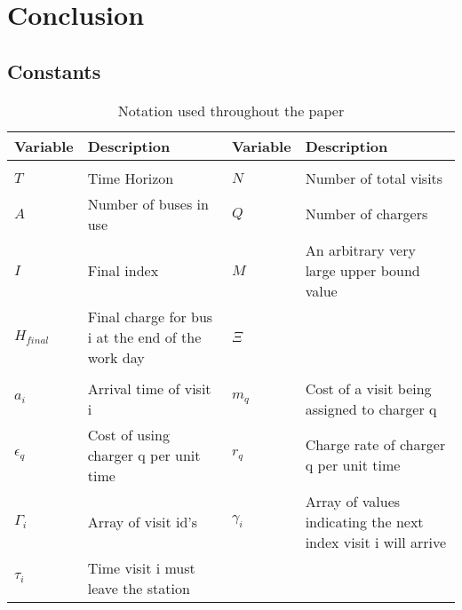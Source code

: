 \documentclass[conference]{IEEEtran}
\begin{document}
\section{Conclusion}

\subsection{Constants}\label{constants}

\begin{table*}[!t]
	\caption{Notation used throughout the paper}
	\label{tab:variables}
	\centering
	\begin{tabular}{l l l l}
		\toprule
		\textbf{Variable} & \textbf{Description} & \textbf{Variable} & \textbf{Description} \\
		\toprule
		\multicolumn{4}{l}{} \\
			$T$         & \textrm{Time Horizon}                                                         &
			$N$         & \textrm{Number of total visits}                                            \\
			$A$         & \textrm{Number of buses in use}                                               &
			$Q$         & \textrm{Number of chargers}                                                \\
			$I$         & \textrm{Final index}                                                          &
			$M$         & \textrm{An arbitrary very large upper bound value}                         \\
			$H_{final}$ & \textrm{Final charge for bus } i \textrm{ at the end of the work day}         &
			$\Xi$       & \\
		\hline
		\multicolumn{4}{l}{} \\
			$a_i$        & \textrm{Arrival time of visit } i                                                    &
			$m_q$        & \textrm{Cost of a visit being assigned to charger } q                                  \\
			$\epsilon_q$ & \textrm{Cost of using charger } q \textrm{ per unit time}                            &
			$r_q$        & \textrm{Charge rate of charger } q \textrm{ per unit time}                             \\
			$\Gamma_i$   & \textrm{Array of visit id's}                                                         &
			$\gamma_i$   & \textrm{Array of values indicating the next index visit } i \textrm{ will arrive}      \\
			$\tau_i$     & \textrm{Time visit } i \textrm{ must leave the station}                              &

\end{tabular}
\end{table*}
\end{document}
